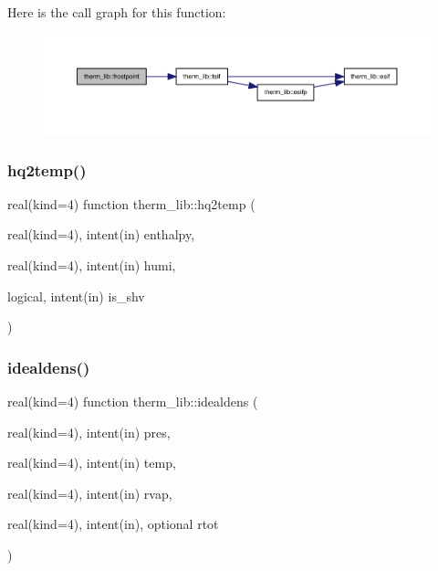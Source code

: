 Here is the call graph for this function\+:
\nopagebreak
\begin{figure}[H]
\begin{center}
\leavevmode
\includegraphics[width=350pt]{namespacetherm__lib_aa7fff31ade0f9d6070e4bc986e0f5e24_cgraph}
\end{center}
\end{figure}
\mbox{\label{namespacetherm__lib_ad10129810640ad98a16dde22a0c244b8}} 
\subsubsection{\texorpdfstring{hq2temp()}{hq2temp()}}
{\footnotesize\ttfamily real(kind=4) function therm\+\_\+lib\+::hq2temp (\begin{DoxyParamCaption}\item[{real(kind=4), intent(in)}]{enthalpy,  }\item[{real(kind=4), intent(in)}]{humi,  }\item[{logical, intent(in)}]{is\+\_\+shv }\end{DoxyParamCaption})}

\mbox{\label{namespacetherm__lib_a5a9775d62adebc1ad0473596c7f51649}} 
\subsubsection{\texorpdfstring{idealdens()}{idealdens()}}
{\footnotesize\ttfamily real(kind=4) function therm\+\_\+lib\+::idealdens (\begin{DoxyParamCaption}\item[{real(kind=4), intent(in)}]{pres,  }\item[{real(kind=4), intent(in)}]{temp,  }\item[{real(kind=4), intent(in)}]{rvap,  }\item[{real(kind=4), intent(in), optional}]{rtot }\end{DoxyParamCaption})}

